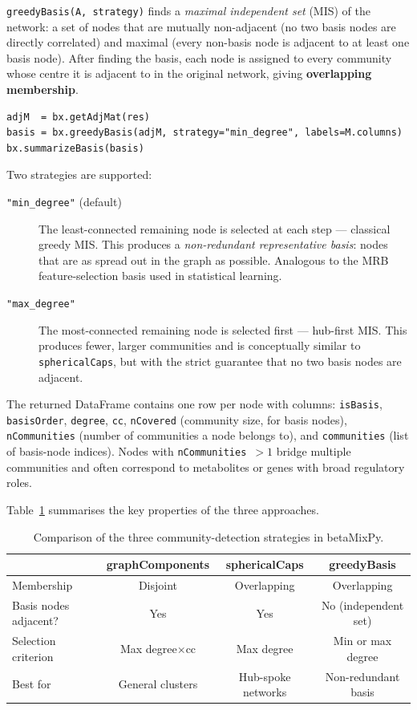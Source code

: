 \documentclass[a4paper,10pt]{article}
\begin{document}
\texttt{greedyBasis(A, strategy)} finds a \emph{maximal independent set} (MIS) of the network: a set of nodes that are mutually non-adjacent (no two basis nodes are directly correlated) and maximal (every non-basis node is adjacent to at least one basis node).  After finding the basis, each node is assigned to every community whose centre it is adjacent to in the original network, giving \textbf{overlapping membership}.

\begin{verbatim}
adjM  = bx.getAdjMat(res)
basis = bx.greedyBasis(adjM, strategy="min_degree", labels=M.columns)
bx.summarizeBasis(basis)
\end{verbatim}

Two strategies are supported:
\begin{description}
  \item[\texttt{"min\_degree"} (default)] The least-connected remaining node is selected at each step --- classical greedy MIS.  This produces a \emph{non-redundant representative basis}: nodes that are as spread out in the graph as possible.  Analogous to the MRB feature-selection basis used in statistical learning.
  \item[\texttt{"max\_degree"}] The most-connected remaining node is selected first --- hub-first MIS.  This produces fewer, larger communities and is conceptually similar to \texttt{sphericalCaps}, but with the strict guarantee that no two basis nodes are adjacent.
\end{description}

The returned DataFrame contains one row per node with columns: \texttt{isBasis}, \texttt{basisOrder}, \texttt{degree}, \texttt{cc}, \texttt{nCovered} (community size, for basis nodes), \texttt{nCommunities} (number of communities a node belongs to), and \texttt{communities} (list of basis-node indices).  Nodes with \texttt{nCommunities}~$>1$ bridge multiple communities and often correspond to metabolites or genes with broad regulatory roles.

Table~\ref{tab:clustering} summarises the key properties of the three approaches.

\begin{table}[h!]
\centering
\begin{tabular}{lccc}
\hline
 & \textbf{graphComponents} & \textbf{sphericalCaps} & \textbf{greedyBasis} \\
\hline
Membership & Disjoint & Overlapping & Overlapping \\
Basis nodes adjacent? & Yes & Yes & No (independent set) \\
Selection criterion & Max degree$\times$cc & Max degree & Min or max degree \\
Best for & General clusters & Hub-spoke networks & Non-redundant basis \\
\hline
\end{tabular}
\caption{Comparison of the three community-detection strategies in betaMixPy.}\label{tab:clustering}
\end{table}
\end{document}
